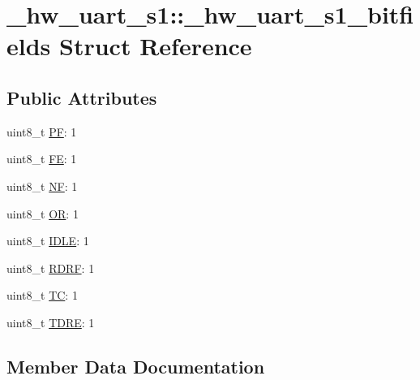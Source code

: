 \hypertarget{struct__hw__uart__s1_1_1__hw__uart__s1__bitfields}{}\section{\+\_\+hw\+\_\+uart\+\_\+s1\+:\+:\+\_\+hw\+\_\+uart\+\_\+s1\+\_\+bitfields Struct Reference}
\label{struct__hw__uart__s1_1_1__hw__uart__s1__bitfields}
\subsection*{Public Attributes}
\begin{DoxyCompactItemize}
\item 
uint8\+\_\+t \hyperlink{struct__hw__uart__s1_1_1__hw__uart__s1__bitfields_abc3f48620f8afbd39fa1076262b9b04e}{PF}\+: 1
\item 
uint8\+\_\+t \hyperlink{struct__hw__uart__s1_1_1__hw__uart__s1__bitfields_a5fcfab74a02c4b0b9846e4ced8ac8d39}{FE}\+: 1
\item 
uint8\+\_\+t \hyperlink{struct__hw__uart__s1_1_1__hw__uart__s1__bitfields_a801deada55e8d90368c3ecab5853ea39}{NF}\+: 1
\item 
uint8\+\_\+t \hyperlink{struct__hw__uart__s1_1_1__hw__uart__s1__bitfields_ae260b2f9bd9fa48596e20b3936815094}{OR}\+: 1
\item 
uint8\+\_\+t \hyperlink{struct__hw__uart__s1_1_1__hw__uart__s1__bitfields_a94f9b96e112e5af7538e37828be09698}{I\+D\+LE}\+: 1
\item 
uint8\+\_\+t \hyperlink{struct__hw__uart__s1_1_1__hw__uart__s1__bitfields_a91cd8698a96af9e18d712f6f882d63a4}{R\+D\+RF}\+: 1
\item 
uint8\+\_\+t \hyperlink{struct__hw__uart__s1_1_1__hw__uart__s1__bitfields_ad52b2f93a5a6f071b36410ba41faa6f5}{TC}\+: 1
\item 
uint8\+\_\+t \hyperlink{struct__hw__uart__s1_1_1__hw__uart__s1__bitfields_a6d75e49f17ffaa8b0db2fc139500ebb7}{T\+D\+RE}\+: 1
\end{DoxyCompactItemize}


\subsection{Member Data Documentation}
